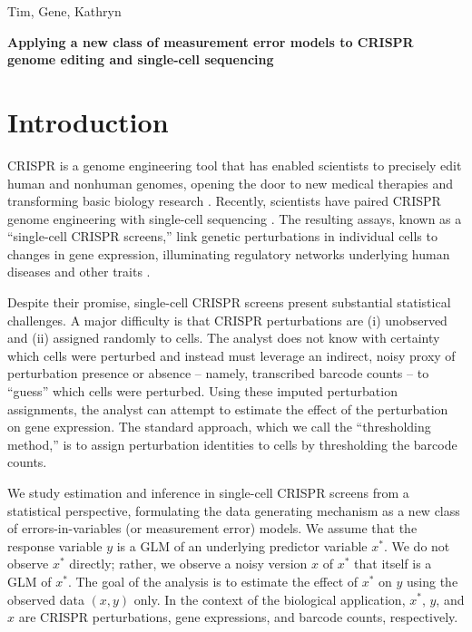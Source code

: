 \documentclass[12pt]{article}
\begin{document}
\noindent
Tim, Gene, Kathryn
\begin{center}
\textbf{Applying a new class of measurement error models to CRISPR genome editing and single-cell sequencing}
\end{center}

\section{Introduction}
CRISPR is a genome engineering tool that has enabled scientists to precisely edit human and nonhuman genomes, opening the door to new medical therapies \cite{Rothgangl2021,Musunuru2021} and transforming basic biology research \cite{Przybyla2021}. Recently, scientists have paired CRISPR genome engineering with single-cell sequencing \cite{Dixit2016,Datlinger2017}. The resulting assays, known as a ``single-cell CRISPR screens,'' link genetic perturbations in individual cells to changes in gene expression, illuminating regulatory networks underlying human diseases and other traits \cite{Morris2021a}.

Despite their promise, single-cell CRISPR screens present substantial statistical challenges. A major difficulty is that CRISPR perturbations are (i) unobserved and (ii) assigned randomly to cells. The analyst does not know with certainty which cells were perturbed and instead must leverage an indirect, noisy proxy of perturbation presence or absence -- namely, transcribed barcode counts -- to ``guess'' which cells were perturbed. Using these imputed perturbation assignments, the analyst can attempt to estimate the effect of the perturbation on gene expression. The standard approach, which we call the ``thresholding method,'' is to assign perturbation identities to cells by thresholding the barcode counts.

We study estimation and inference in single-cell CRISPR screens from a statistical perspective, formulating the data generating mechanism as a new class of errors-in-variables (or measurement error) models. We assume that the response variable $y$ is a GLM of an underlying predictor variable $x^*$. We do not observe $x^*$ directly; rather, we observe a noisy version $x$ of $x^*$ that itself is a GLM of $x^*$. The goal of the analysis is to estimate the effect of $x^*$ on $y$ using the observed data $(x , y)$ only. In the context of the biological application, $x^*$, $y$, and $x$ are CRISPR perturbations, gene expressions, and barcode counts, respectively.
\end{document}
